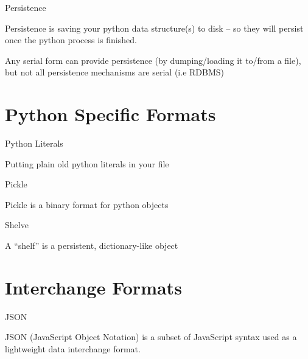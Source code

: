 \documentclass{beamer}
\begin{document}
\begin{frame}[fragile]{Persistence}

\vfill
{\Large Persistence is saving your python data structure(s) to disk -- so they
will persist once the python process is finished.}

\vfill
{\Large Any serial form can provide persistence (by dumping/loading it to/from
a file), but not all persistence mechanisms are serial (i.e RDBMS)}

\vfill

\end{frame} 


\section{Python Specific Formats}

\begin{frame}[fragile]{Python Literals}

\vfill
{\Large Putting plain old python literals in your file}

\end{frame} 

\begin{frame}[fragile]{Pickle}

\vfill
{\Large Pickle is a binary format for python objects}

\end{frame} 

\begin{frame}[fragile]{Shelve}

\vfill
{\Large A “shelf” is a persistent, dictionary-like object}

\end{frame} 


\section{Interchange Formats} 

\begin{frame}[fragile]{JSON}

\vfill
{\Large JSON (JavaScript Object Notation) is a subset of JavaScript syntax
        used as a lightweight data interchange format.}

\end{frame} 
\end{document}
